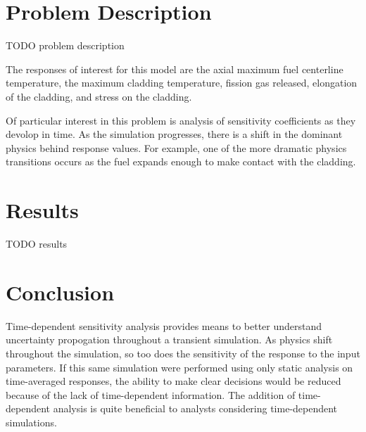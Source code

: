 \section{Problem Description}
TODO problem description

The responses of interest for this model are the axial maximum fuel centerline temperature, the maximum cladding temperature,
fission gas released, elongation of the cladding, and stress on the cladding.

Of particular interest in this problem is analysis of sensitivity coefficients as they devolop in time.  As the
simulation progresses, there is a shift in the dominant physics behind response values.  For example, one of the more
dramatic physics transitions occurs as the fuel expands enough to make contact with the cladding.

\section{Results}
TODO results

\section{Conclusion}
Time-dependent sensitivity analysis provides means to better understand uncertainty propogation throughout a transient simulation.
As physics shift throughout the simulation, so too does the sensitivity of the response to the input parameters.  If this same
simulation were performed using only static analysis on time-averaged responses, the ability to make clear decisions would be
reduced because of the lack of time-dependent information.  The addition of time-dependent analysis is quite beneficial to 
analysts considering time-dependent simulations.

